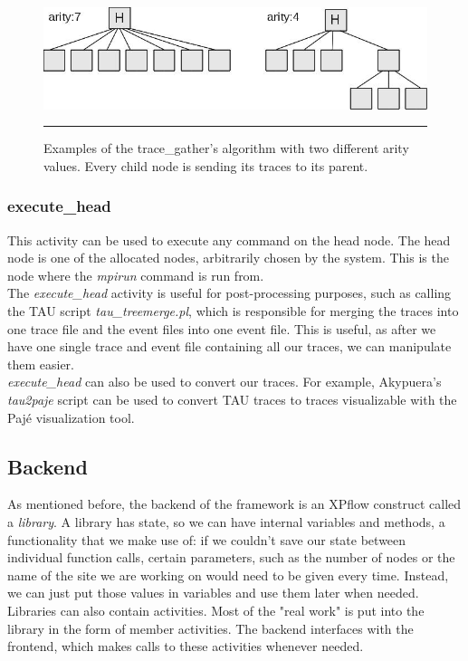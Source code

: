 \begin{figure}[htbp]
  \centering
    \includegraphics[scale=0.6]{./Figures/tracegather_arity.jpg}
    \rule{35em}{0.5pt}
  \caption[Arity in trace\_gather]{Examples of the trace\_gather's
    algorithm with two different arity values. Every child node is
    sending its traces to its parent.}
  \label{fig:tracegather_arity}
\end{figure}

\subsubsection{execute\_head}
This activity can be used to execute any command on the head node. The
head node is one of the allocated nodes, arbitrarily chosen by the
system. This is the node where the \emph{mpirun} command is run
from.\\[0.3cm]
The \emph{execute\_head} activity is useful for post-processing
purposes, such as calling the TAU\cite{sm06} script
\emph{tau\_treemerge.pl}, which is responsible for merging the traces
into one trace file and the event files into one event file. This is
useful, as after we have one single trace and event file containing
all our traces, we can manipulate them easier.\\[0.3cm]
\emph{execute\_head} can also be used to convert our traces. For
example, Akypuera's\cite{s13} \emph{tau2paje} script can be used to
convert TAU traces to traces visualizable with the Pajé\cite{cob00}
visualization tool.
\subsection{Backend}
As mentioned before, the backend of the framework is an XPflow
construct called a \emph{library}. A library has state, so we can have
internal variables and methods, a functionality that we make use of:
if we couldn't save our state between individual function calls,
certain parameters, such as the number of nodes or the name of the
site we are working on would need to be given every time. Instead, we
can just put those values in variables and use them later when
needed.\\[0.3cm]
Libraries can also contain activities. Most of the "real work" is put
into the library in the form of member activities. The backend
interfaces with the frontend, which makes calls to these activities
whenever needed.

